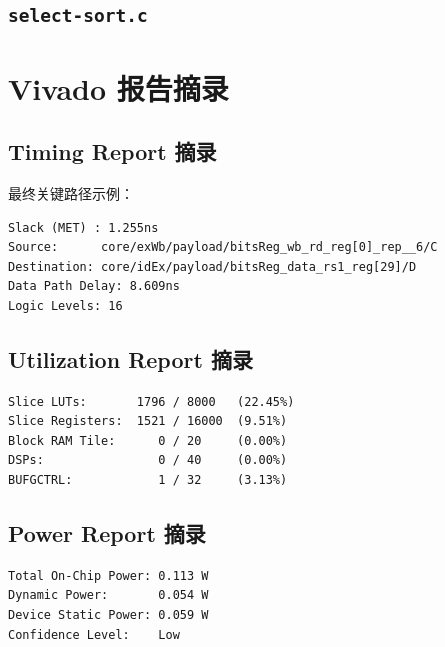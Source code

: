 \documentclass[UTF8,a4paper,12pt]{ctexrep}
\begin{document}


\section{\texttt{select-sort.c}}



\chapter{Vivado 报告摘录}

\section{Timing Report 摘录}

最终关键路径示例：

\begin{lstlisting}[language={}]
Slack (MET) : 1.255ns
Source:      core/exWb/payload/bitsReg_wb_rd_reg[0]_rep__6/C
Destination: core/idEx/payload/bitsReg_data_rs1_reg[29]/D
Data Path Delay: 8.609ns
Logic Levels: 16
\end{lstlisting}

\section{Utilization Report 摘录}

\begin{lstlisting}[language={}]
Slice LUTs:       1796 / 8000   (22.45%)
Slice Registers:  1521 / 16000  (9.51%)
Block RAM Tile:      0 / 20     (0.00%)
DSPs:                0 / 40     (0.00%)
BUFGCTRL:            1 / 32     (3.13%)
\end{lstlisting}

\section{Power Report 摘录}

\begin{lstlisting}[language={}]
Total On-Chip Power: 0.113 W
Dynamic Power:       0.054 W
Device Static Power: 0.059 W
Confidence Level:    Low
\end{lstlisting}
\end{document}

